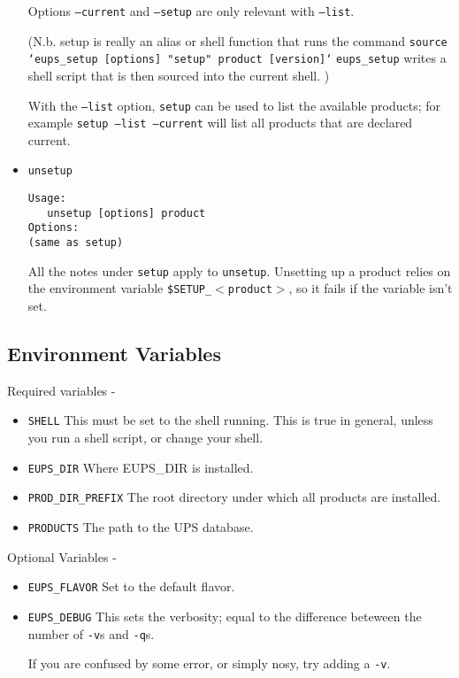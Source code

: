 \documentclass{article}
\begin{document}
\begin{itemize}
Options \texttt{--current} and \texttt{--setup} are only relevant with \texttt{--list}.

(N.b. setup is really an alias or shell function that runs the command\hfil\break
\texttt{source `eups\_setup [options] "setup" product [version]`}\hfil\break
\texttt{eups\_setup} writes a shell script that is then sourced into the
current shell.
)

With the \texttt{--list} option, \texttt{setup} can be used to list the available
products; for example \texttt{setup --list --current} will list all products that
are declared current.


\item \texttt{unsetup}
\begin{verbatim}
Usage:
   unsetup [options] product
Options:
(same as setup)
\end{verbatim}
  
All the notes under \texttt{setup} apply to
\texttt{unsetup}. Unsetting up a product relies on the environment
variable \texttt{\$SETUP\_$<$product$>$}, so it fails if the variable
isn't set.

\end{itemize}

\subsection{Environment Variables}

Required variables -

\begin{itemize}
  \item \texttt{SHELL}
    This must be set to the shell running. This is true in general, unless
    you run a shell script, or change your shell.

  \item \texttt{EUPS\_DIR}
    Where EUPS\_DIR is installed.

  \item \texttt{PROD\_DIR\_PREFIX}
    The root directory under which all products are installed.

  \item \texttt{PRODUCTS}
    The path to the UPS database.
\end{itemize}

Optional Variables -

\begin{itemize}
  \item \texttt{EUPS\_FLAVOR}
    Set to the default flavor.

  \item \texttt{EUPS\_DEBUG}
    This sets the verbosity; equal to the difference beteween the number of \texttt{-v}s
    and \texttt{-q}s.

    If you are confused by some error, or simply nosy, try adding a \texttt{-v}.
\end{itemize}
\end{document}
